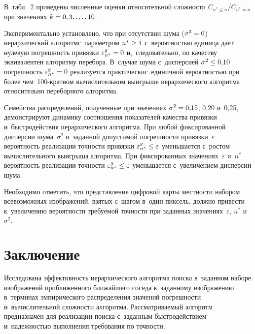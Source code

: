 \begin{multicols}{2}
В~табл.~2 приведены 
численные оценки относительной сложности $C_{n^*\leq n}/C_{n^*=n}$ при
значениях $k\hm=0, 3, \ldots , 10$.
  
  Экспериментально установлено, что при отсутствии шума ($\sigma^2\hm=0$) 
иерархический алгоритм\linebreak с~параметром $n^*\hm\geq 1$ с~вероятностью единица 
дает нуле\-вую погрешность привязки $\varepsilon^g_{n^*}\hm=0$ 
и,~следовательно, по качеству эквивалентен алгоритму перебора. В~случае 
шума с~дисперсией $\sigma^2\hm\leq 0{,}10$ погрешность $\varepsilon^g_{n^*} 
\hm=0$ реализуется практически\linebreak с~единичной вероятностью при более 
чем~\mbox{100-крат}\-ном вы\-чис\-ли\-тель\-ном выигрыше иерархического алгоритма 
относительно переборного ал\-го\-ритма. 
{ %

}


Семейства распределений, полученные 
при значениях $\sigma^2\hm=0{,}15$, 0{,}20 и~0{,}25, демонстрируют динамику 
соотношения показателей качества привязки и~быст\-ро\-дей\-ст\-вия иерархического 
алгоритма. При любой фиксированной дисперсии шума~$\sigma^2$ и~заданной 
допустимой погрешности привязки~$\varepsilon$ вероятность реализации 
точности привязки $\varepsilon^g_{n^*}\hm\leq\varepsilon$ уменьшается 
с~ростом вычислительного выигрыша алгоритма. При 
фиксированных значениях~$\varepsilon$ и~$n^*$ вероятность реализации %
точ\-ности $\varepsilon^g_{n^*}\hm\leq \varepsilon$ уменьшается с~увеличением 
дисперсии шума. 

Необходимо отметить, что пред\-став\-ле\-ние циф\-ро\-вой карты 
местности набором всевозможных изображений, взятых с~шагом в~один %
пиксель, должно привести к~увеличению ве\-ро\-ят\-ности тре\-бу\-емой точ\-ности при 
заданных значениях~$\varepsilon$, $n^*$ и~$\sigma^2$.
{ %

} 




  
  \section{Заключение }
  
  Исследована эффективность иерархического алгоритма поиска в~заданном 
наборе изображений приближенного ближайшего соседа к~заданному 
изображению в~терминах эмпирического распределения значений погрешности и~вычислительной сложности алгоритма. Рассматриваемый алгоритм 
предназначен для реализации поиска с~заданным быстродействием 
и~надежностью выполнения требования по точности. 


\end{multicols}
